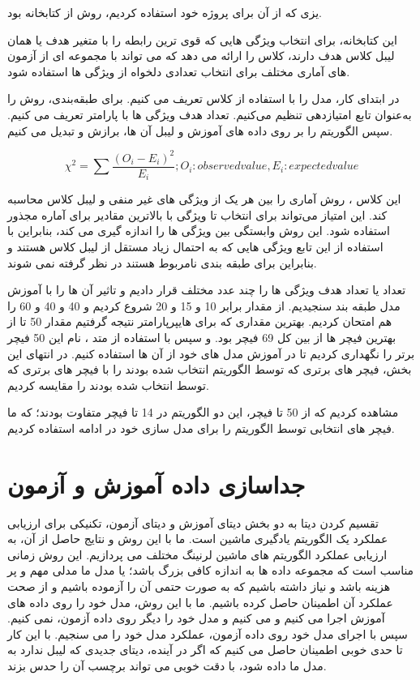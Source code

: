 \documentclass[12pt,onecolumn,a4paper]{article}
\begin{document}
یزی که از آن برای پروژه خود استفاده کردیم، روش  از کتابخانه  بود.

این کتابخانه، برای انتخاب ویژگی هایی که قوی ترین رابطه را با متغیر هدف یا همان لیبل کلاس هدف دارند، کلاس  را ارائه می دهد که می تواند با مجموعه ای از آزمون های آماری مختلف برای انتخاب تعدادی دلخواه از ویژگی ها استفاده شود.

در ابتدای کار، مدل را با استفاده از کلاس  تعریف می کنیم. برای طبقه‌بندی، روش  را به‌عنوان تابع امتیازدهی تنظیم می‌کنیم. تعداد هدف ویژگی ها با پارامتر  تعریف می کنیم. سپس الگوریتم را بر روی داده های آموزش و لیبل آن ها، برازش و تبدیل می کنیم.

\begin{equation}
        \chi^2 = \sum \frac{(O_i - E_i)^2}{E_i} ; O_i: observed value, E_i: expected value
\end{equation}

این کلاس ، روش آماری  را بین هر یک از ویژگی های غیر منفی و لیبل کلاس محاسبه کند. این امتیاز می‌تواند برای انتخاب  تا ویژگی‌ با بالاترین مقادیر برای آماره مجذور  استفاده شود. این روش وابستگی بین ویژگی ها را اندازه گیری می کند، بنابراین با استفاده از این تابع ویژگی هایی که به احتمال زیاد مستقل از لیبل کلاس هستند و بنابراین برای طبقه بندی نامربوط هستند در نظر گرفته نمی شوند.

تعداد  یا تعداد هدف ویژگی ها را چند عدد مختلف قرار دادیم و تاثیر آن ها را با آموزش مدل طبقه بند  سنجیدیم. از مقدار  برابر 10 و 15 و 20 شروع کردیم و 40 و 40 و 60 را هم امتحان کردیم. بهترین مقداری که برای هایپرپارامتر  نتیجه گرفتیم مقدار 50 تا از بهترین فیچر ها از بین کل 69 فیچر بود. و سپس با استفاده از متد ، نام این 50 فیچر برتر را نگهداری کردیم تا در آموزش مدل های خود از آن ها استفاده کنیم.
در انتهای این بخش، فیچر های برتری که توسط الگوریتم  انتخاب شده بودند را با فیچر های برتری که توسط  انتخاب شده بودند را مقایسه کردیم. 

مشاهده کردیم که از 50 تا فیچر، این دو الگوریتم در 14 تا فیچر متفاوت بودند؛ که ما فیچر های انتخابی توسط الگوریتم  را برای مدل سازی خود در ادامه استفاده کردیم.

\section{جداسازی داده آموزش و آزمون}
تقسیم کردن دیتا به دو بخش دیتای آموزش و دیتای آزمون، تکنیکی برای ارزیابی عملکرد یک الگوریتم یادگیری ماشین است. ما با این روش و نتایج حاصل از آن، به ارزیابی عملکرد الگوریتم های ماشین لرنینگ مختلف می پردازیم. این روش زمانی مناسب است که مجموعه داده ها به اندازه کافی بزرگ باشد؛ یا مدل ما مدلی مهم و پر هزینه باشد و نیاز داشته باشیم که به صورت حتمی آن را آزموده باشیم و از صحت عملکرد آن اطمینان حاصل کرده باشیم. ما با این روش، مدل خود را روی داده های آموزش اجرا می کنیم و  می کنیم و مدل خود را دیگر روی داده آزمون،  نمی کنیم. سپس با اجرای مدل خود روی داده آزمون، عملکرد مدل خود را می سنجیم. با این کار تا حدی خوبی اطمینان حاصل می کنیم که اگر در آینده، دیتای جدیدی که لیبل ندارد به مدل ما داده شود، با دقت خوبی می تواند برچسب آن را حدس بزند.
\end{document}
